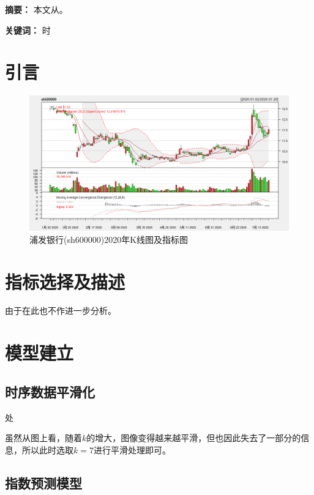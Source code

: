 \documentclass[10pt]{ctexart}
\begin{document}
	
	\newpage
	
	
	\textbf{\heiti 摘要：} 本文从。
	
	
	\textbf{\heiti 关键词：} 时
	
\section{引言}
	

	\begin{figure}[H]
		\centering
		\includegraphics[width=0.95\linewidth]{figs/1}
		\caption[图1]{浦发银行(sh600000)2020年K线图及指标图}
		\label{fig:1}
	\end{figure}
	

	
	
	
	
	\section{指标选择及描述}
	由于在此也不作进一步分析。
	
\section{模型建立}
	
	\subsection{时序数据平滑化}
	
		处
		
		
		虽然从图上看，随着$k$的增大，图像变得越来越平滑，但也因此失去了一部分的信息，所以此时选取$k=7$进行平滑处理即可。
		
	\subsection{指数预测模型}
	
\end{document}
